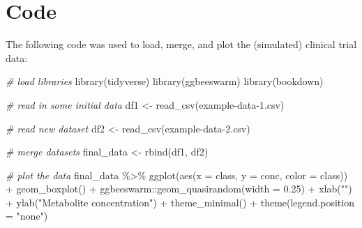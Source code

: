 \documentclass[smallextended]{svjour3}       %
\newenvironment{Shaded}{\begin{snugshade}}{\end{snugshade}}
\newcommand{\AttributeTok}[1]{\textcolor[rgb]{0.77,0.63,0.00}{#1}}
\newcommand{\CommentTok}[1]{\textcolor[rgb]{0.56,0.35,0.01}{\textit{#1}}}
\newcommand{\FloatTok}[1]{\textcolor[rgb]{0.00,0.00,0.81}{#1}}
\newcommand{\FunctionTok}[1]{\textcolor[rgb]{0.00,0.00,0.00}{#1}}
\newcommand{\NormalTok}[1]{#1}
\newcommand{\OtherTok}[1]{\textcolor[rgb]{0.56,0.35,0.01}{#1}}
\newcommand{\SpecialCharTok}[1]{\textcolor[rgb]{0.00,0.00,0.00}{#1}}
\newcommand{\StringTok}[1]{\textcolor[rgb]{0.31,0.60,0.02}{#1}}
\begin{document}
\hypertarget{code}{%
\section{Code}\label{code}}

The following code was used to load, merge, and plot the (simulated) clinical trial data:

\begin{Shaded}
\begin{Highlighting}[]
\CommentTok{\# load libraries}
\FunctionTok{library}\NormalTok{(tidyverse)}
\FunctionTok{library}\NormalTok{(ggbeeswarm)}
\FunctionTok{library}\NormalTok{(bookdown)}
\end{Highlighting}
\end{Shaded}

\begin{Shaded}
\begin{Highlighting}[]
\CommentTok{\# read in some initial data}
\NormalTok{df1 }\OtherTok{\textless{}{-}} \FunctionTok{read\_csv}\NormalTok{(}\StringTok{\textquotesingle{}example{-}data{-}1.csv\textquotesingle{}}\NormalTok{)}
\end{Highlighting}
\end{Shaded}

\begin{Shaded}
\begin{Highlighting}[]
\CommentTok{\# read new dataset}
\NormalTok{df2 }\OtherTok{\textless{}{-}} \FunctionTok{read\_csv}\NormalTok{(}\StringTok{\textquotesingle{}example{-}data{-}2.csv\textquotesingle{}}\NormalTok{)}
\end{Highlighting}
\end{Shaded}

\begin{Shaded}
\begin{Highlighting}[]
\CommentTok{\# merge datasets}
\NormalTok{final\_data }\OtherTok{\textless{}{-}} \FunctionTok{rbind}\NormalTok{(df1, df2)}
\end{Highlighting}
\end{Shaded}

\begin{Shaded}
\begin{Highlighting}[]
\CommentTok{\# plot the data}
\NormalTok{final\_data }\SpecialCharTok{\%\textgreater{}\%} 
  \FunctionTok{ggplot}\NormalTok{(}\FunctionTok{aes}\NormalTok{(}\AttributeTok{x =}\NormalTok{ class, }\AttributeTok{y =}\NormalTok{ conc, }\AttributeTok{color =}\NormalTok{ class)) }\SpecialCharTok{+}
  \FunctionTok{geom\_boxplot}\NormalTok{() }\SpecialCharTok{+}
\NormalTok{  ggbeeswarm}\SpecialCharTok{::}\FunctionTok{geom\_quasirandom}\NormalTok{(}\AttributeTok{width =} \FloatTok{0.25}\NormalTok{) }\SpecialCharTok{+} 
  \FunctionTok{xlab}\NormalTok{(}\StringTok{""}\NormalTok{) }\SpecialCharTok{+}
  \FunctionTok{ylab}\NormalTok{(}\StringTok{"Metabolite concentration"}\NormalTok{) }\SpecialCharTok{+} 
  \FunctionTok{theme\_minimal}\NormalTok{() }\SpecialCharTok{+}
  \FunctionTok{theme}\NormalTok{(}\AttributeTok{legend.position =} \StringTok{"none"}\NormalTok{)}
\end{Highlighting}
\end{Shaded}
\end{document}
